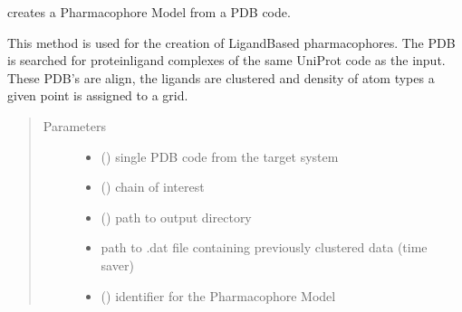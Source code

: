 \documentclass[letterpaper,10pt,english]{sphinxmanual}
\begin{document}
\begin{fulllineitems}
\begin{fulllineitems}
\end{fulllineitems}


\begin{fulllineitems}
\label{\detokenize{hs_pharmacophore_api:hotspots.hs_pharmacophore.PharmacophoreModel.from_pdb}}
creates a Pharmacophore Model from a PDB code.

This method is used for the creation of Ligand\sphinxhyphen{}Based pharmacophores. The PDB is searched for protein\sphinxhyphen{}ligand
complexes of the same UniProt code as the input. These PDB’s are align, the ligands are clustered and density
of atom types a given point is assigned to a grid.
\begin{quote}\begin{description}
\item[{Parameters}] \leavevmode\begin{itemize}
\item {} 
 () \textendash{} single PDB code from the target system

\item {} 
 () \textendash{} chain of interest

\item {} 
 () \textendash{} path to output directory

\item {} 
 \textendash{} path to .dat file containing previously clustered data (time saver)

\item {} 
 () \textendash{} identifier for the Pharmacophore Model

\end{itemize}


\end{description}
\end{quote}
\end{fulllineitems}
\end{fulllineitems}
\end{document}
